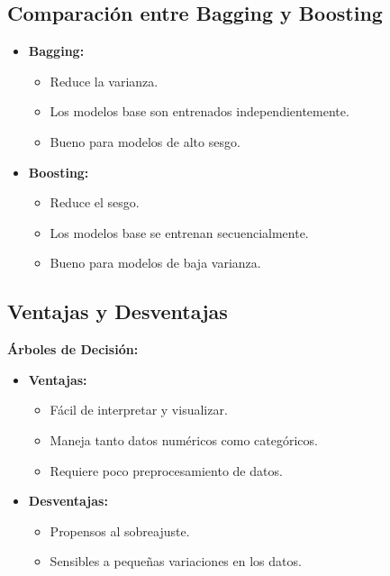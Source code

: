 \documentclass[a4paper, 11pt]{article}
\begin{document}
\subsection{Comparación entre Bagging y Boosting}

\begin{itemize}
    \item \textbf{Bagging:}
    \begin{itemize}
        \item Reduce la varianza.
        \item Los modelos base son entrenados independientemente.
        \item Bueno para modelos de alto sesgo.
    \end{itemize}
    \item \textbf{Boosting:}
    \begin{itemize}
        \item Reduce el sesgo.
        \item Los modelos base se entrenan secuencialmente.
        \item Bueno para modelos de baja varianza.
    \end{itemize}
\end{itemize}

\subsection{Ventajas y Desventajas}

\textbf{Árboles de Decisión:}

\begin{itemize}
    \item \textbf{Ventajas:}
    \begin{itemize}
        \item Fácil de interpretar y visualizar.
        \item Maneja tanto datos numéricos como categóricos.
        \item Requiere poco preprocesamiento de datos.
    \end{itemize}
    \item \textbf{Desventajas:}
    \begin{itemize}
        \item Propensos al sobreajuste.
        \item Sensibles a pequeñas variaciones en los datos.
    \end{itemize}
\end{itemize}
\end{document}
